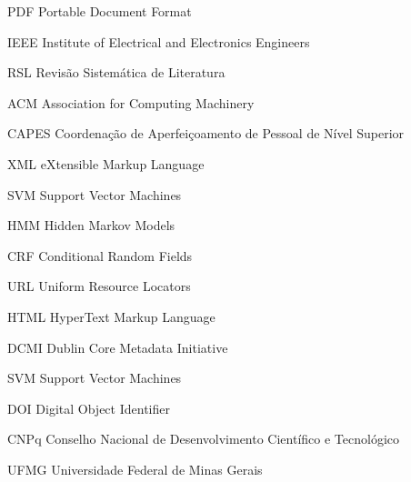 
\begin{siglas}
  \item[PDF] Portable Document Format
  \item[IEEE] Institute of Electrical and Electronics Engineers
  \item[RSL] Revisão Sistemática de Literatura
  \item[ACM] Association for Computing Machinery
  \item[CAPES] Coordenação de Aperfeiçoamento de Pessoal de Nível Superior
  \item[XML] eXtensible Markup Language
  \item[SVM] Support Vector Machines
  \item[HMM] Hidden Markov Models
  \item[CRF] Conditional Random Fields
  \item[URL] Uniform Resource Locators
  \item[HTML] HyperText Markup Language
  \item[DCMI] Dublin Core Metadata Initiative
  \item[SVM] Support Vector Machines
  \item[DOI] Digital Object Identifier
  \item[CNPq] Conselho Nacional de Desenvolvimento Científico e Tecnológico
  \item[UFMG] Universidade Federal de Minas Gerais
\end{siglas}